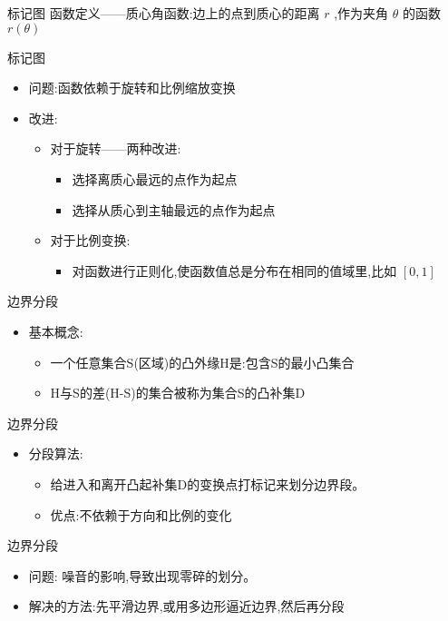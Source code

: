 \documentclass[presentation]{beamer}
\begin{document}
\begin{frame}[label={sec:org58513f4}]{标记图}
函数定义——质心角函数:边上的点到质心的距离 \(r\) ,作为夹角 \(\theta\) 的函数 \(r(\theta)\)
\end{frame}

\begin{frame}[label={sec:orgca7ea82}]{标记图}
\begin{itemize}
\item 问题:函数依赖于旋转和比例缩放变换
\item 改进: 
\begin{itemize}
\item 对于旋转——两种改进:
\begin{itemize}
\item 选择离质心最远的点作为起点
\item 选择从质心到主轴最远的点作为起点
\end{itemize}
\item 对于比例变换:
\begin{itemize}
\item 对函数进行正则化,使函数值总是分布在相同的值域里,比如 \([0,1]\)
\end{itemize}
\end{itemize}
\end{itemize}
\end{frame}
\begin{frame}[label={sec:org39937ef}]{边界分段}
\begin{itemize}
\item 基本概念:
\begin{itemize}
\item 一个任意集合S(区域)的凸外缘H是:包含S的最小凸集合
\item H与S的差(H-S)的集合被称为集合S的凸补集D
\end{itemize}
\end{itemize}
\end{frame}
\begin{frame}[label={sec:org7a2f5c6}]{边界分段}
\begin{itemize}
\item 分段算法:
\begin{itemize}
\item 给进入和离开凸起补集D的变换点打标记来划分边界段。
\item 优点:不依赖于方向和比例的变化
\end{itemize}
\end{itemize}
\end{frame}
\begin{frame}[label={sec:orgec184cb}]{边界分段}
\begin{itemize}
\item 问题: 噪音的影响,导致出现零碎的划分。
\item 解决的方法:先平滑边界,或用多边形逼近边界,然后再分段
\end{itemize}
\end{frame}
\end{document}
